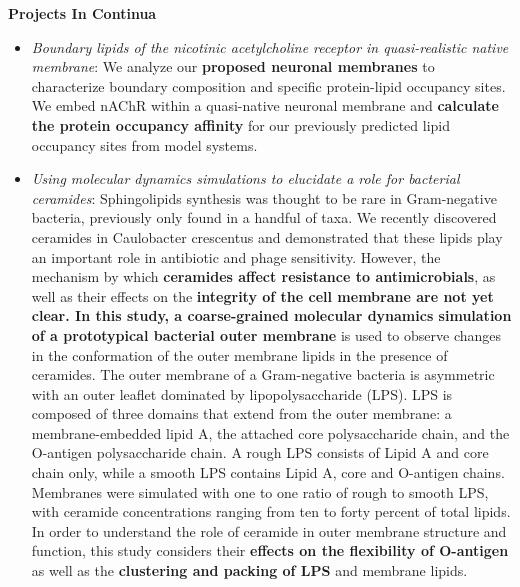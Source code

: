 \documentclass[oneside]{report}
\begin{document}
{\bf Projects In Continua}
\begin{itemize}
\item \textit{Boundary lipids of the nicotinic acetylcholine receptor in quasi-realistic native membrane}: We analyze our {\bf proposed neuronal membranes} to characterize boundary composition and specific protein-lipid occupancy sites. We embed nAChR within a quasi-native neuronal membrane and {\bf calculate the protein occupancy affinity} for our previously predicted lipid occupancy sites from model systems.

\item \textit{Using molecular dynamics simulations to elucidate a role for bacterial ceramides}: Sphingolipids synthesis was thought to be rare in Gram-negative bacteria, previously only found in a handful of taxa. We recently discovered ceramides in Caulobacter crescentus and demonstrated that these lipids play an important role in antibiotic and phage sensitivity. However, the mechanism by which {\bf ceramides affect resistance to antimicrobials}, as well as their effects on the {\bf integrity of the cell membrane are not yet clear. In this study, a {\bf coarse-grained molecular dynamics simulation} of a prototypical bacterial outer membrane} is used to observe changes in the conformation of the outer membrane lipids in the presence of ceramides. The outer membrane of a Gram-negative bacteria is asymmetric with an outer leaflet dominated by lipopolysaccharide (LPS). LPS is composed of three domains that extend from the outer membrane: a membrane-embedded lipid A, the attached core polysaccharide chain, and the O-antigen polysaccharide chain. A rough LPS consists of Lipid A and core chain only, while a smooth LPS contains Lipid A, core and O-antigen chains. Membranes were simulated with one to one ratio of rough to smooth LPS, with ceramide concentrations ranging from ten to forty percent of total lipids.  In order to understand the role of ceramide in outer membrane structure and function, this study considers their {\bf effects on the flexibility of O-antigen} as well as the {\bf clustering and packing of LPS} and membrane lipids.


\end{itemize}
\end{document}
